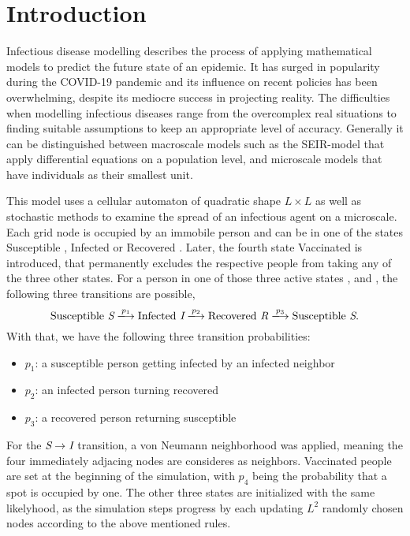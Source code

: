 \section{Introduction}

Infectious disease modelling describes the process of applying mathematical models to predict the future state of an epidemic. 
It has surged in popularity during the COVID-19 pandemic and its influence on recent policies has been overwhelming, despite its mediocre success in projecting reality. 
The difficulties when modelling infectious diseases range from the overcomplex real situations to finding suitable assumptions to keep an appropriate level of accuracy.
Generally it can be distinguished between macroscale models such as the SEIR-model\cite{SEIR_Heidelberg} that apply differential equations on a population level, 
and microscale models that have individuals as their smallest unit.

This model uses a cellular automaton\cite{CellularAutomaton} of quadratic shape $L\times L$ as well as stochastic methods to examine the spread of an infectious agent on a microscale. 
Each grid node is occupied by an immobile person and can be in one of the states Susceptible \susceptible{}, Infected \infected{} or Recovered \recovered{}. Later, the fourth state Vaccinated \vaccinated{} is introduced, 
that permanently excludes the respective people from taking any of the three other states. 
For a person in one of those three active states \susceptible{}, \infected{} and \recovered{}, the following three transitions are possible,
\begin{equation*}
    \mathrm{Susceptible}~\susceptible\xlongrightarrow{p_1}\mathrm{Infected}~\infected{}\xlongrightarrow{p_2}\mathrm{Recovered}~\recovered{}\xlongrightarrow{p_3}\mathrm{Susceptible}~\susceptible{}.
\end{equation*}
With that, we have the following three transition probabilities:
\begin{itemize}
    \item $p_1$: a susceptible person getting infected by an infected neighbor
    \item $p_2$: an infected person turning recovered
    \item $p_3$: a recovered person returning susceptible
\end{itemize}
For the $\textit{S}{}\rightarrow\textit{I}{}$ transition, a von Neumann neighborhood was applied, meaning the four immediately adjacing nodes are consideres as neighbors.\cite{CellularAutomaton} 
Vaccinated people \vaccinated{} are set at the beginning of the simulation, with $p_4$ being the probability that a spot is occupied by one. The other three states are initialized with the same likelyhood, as the 
simulation steps progress by each updating $L^2$ randomly chosen nodes according to the above mentioned rules.

